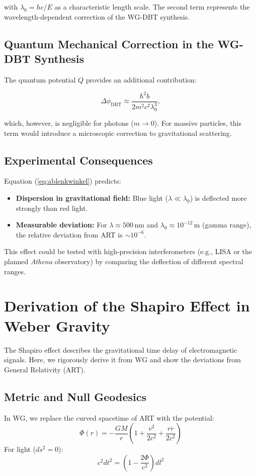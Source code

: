 with $\lambda_0 = hc/E$ as a characteristic length scale. The second term represents the wavelength-dependent correction of the WG-DBT synthesis.

\subsection{Quantum Mechanical Correction in the WG-DBT Synthesis}
The quantum potential $Q$ provides an additional contribution:

\begin{equation}
\Delta \phi_{\text{DBT}} \approx \frac{\hbar^2 b}{2m^2 c^2 \lambda_0^3},
\end{equation}

which, however, is negligible for photons ($m \to 0$). For massive particles, this term would introduce a microscopic correction to gravitational scattering.

\subsection{Experimental Consequences}
Equation (\ref{eq:ablenkwinkel}) predicts:
\begin{itemize}
\item \textbf{Dispersion in gravitational field:} Blue light ($\lambda \ll \lambda_0$) is deflected more strongly than red light.
\item \textbf{Measurable deviation:} For $\lambda \approx 500\,\text{nm}$ and $\lambda_0 \approx 10^{-12}\,\text{m}$ (gamma range), the relative deviation from ART is $\sim 10^{-6}$.
\end{itemize}

This effect could be tested with high-precision interferometers (e.g., LISA or the planned \textit{Athena} observatory) by comparing the deflection of different spectral ranges.

\section{Derivation of the Shapiro Effect in Weber Gravity}
\label{sec:shapiro_effect_wg_dbt}

The Shapiro effect describes the gravitational time delay of electromagnetic signals. Here, we rigorously derive it from WG and show the deviations from General Relativity (ART).

\subsection{Metric and Null Geodesics}
In WG, we replace the curved spacetime of ART with the potential:
\begin{equation}
\Phi(r) = -\frac{GM}{r}\left(1 + \frac{v^2}{2c^2} + \frac{r\ddot{r}}{2c^2}\right)
\end{equation}
For light ($ds^2 = 0$):
\begin{equation}
c^2dt^2 = \left(1 - \frac{2\Phi}{c^2}\right)dl^2
\end{equation}

